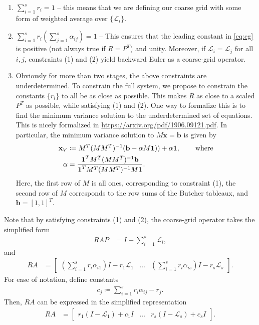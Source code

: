 \documentclass[a4paper,10pt]{article}
\begin{document}
\begin{enumerate}
	\item $\sum_{i=1}^s r_i = 1$ -- this means that we are defining our
	coarse grid with some form of weighted average over $\{\mathcal{L}_i\}$.
	\item $\sum_{i=1}^s r_i \left(\sum_{j=1}^s \alpha_{ij}\right) = 1$ --
	This ensures that the leading constant in \eqref{eq:cg} is positive (not
	always true if $R = P^T$) and unity. Moreover, if $\mathcal{L}_i = \mathcal{L}_j$
	for all $i,j$, constraints (1) and (2) yield backward Euler as a coarse-grid
	operator.
	\item Obviously for more than two stages, the above constraints are underdetermined.
	To constrain the full system, we propose to constrain the constants $\{r_i\}$
	to all be as close as possible. This makes $R$ as close to a scaled $P^T$ as
	possible, while satisfying (1) and (2). One way to formalize this is to 
	find the minimum variance solution to the underdetermined set of equations.
	This is nicely formalized in \url{https://arxiv.org/pdf/1906.09121.pdf}. In
	particular, the minimum variance solution to $M\mathbf{x} = \mathbf{b}$ is
	given by
	\begin{align*}
	\mathbf{x}_V &\coloneqq M^T(MM^T)^{-1}(\mathbf{b} - \alpha M\boldsymbol{1})) + \alpha\boldsymbol{1},
		\hspace{5ex}\textnormal{where}\\
	\alpha & = \frac{\boldsymbol{1}^TM^T(MM^T)^{-1}\mathbf{b}}
		{\boldsymbol{1}^TM^T(MM^T)^{-1}M\boldsymbol{1}}.
	\end{align*}
	Here, the first row of $M$ is all ones, corresponding to constraint (1),
	the second row of $M$ corresponds to the row sums of the Butcher tableaux,
	and $\mathbf{b} = [1,1]^T$.

\end{enumerate}

Note that by satisfying constraints (1) and (2), the coarse-grid operator
takes the simplified form
%
\begin{align}\label{eq:cg2}
RAP & = I - \sum_{i=1}^s \mathcal{L}_i,
\end{align}
%
and
%
\begin{align*}
RA & = \begin{bmatrix} \left(\sum_{i=1}^s r_i\alpha_{i1}\right)I - r_1\mathcal{L}_1
	& \hdots & \left(\sum_{i=1}^s r_i\alpha_{is}\right)I - r_s\mathcal{L}_s\end{bmatrix} .
\end{align*}
%
For ease of notation, define constants
%
\begin{align*}
c_j \coloneqq \sum_{i=1}^s r_i\alpha_{ij} - r_j.
\end{align*}
%
Then, $RA$ can be expressed in the simplified representation
%
\begin{align}\label{eq:simp}
RA & = \begin{bmatrix} r_1(I - \mathcal{L}_1) + c_1I
	& \hdots & r_s(I - \mathcal{L}_s) + c_sI\end{bmatrix}.
\end{align}
%
\end{document}

